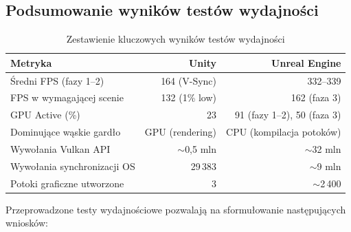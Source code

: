 \subsection{Podsumowanie wyników testów wydajności}
\label{subsec:podsumowanie-testow}

\begin{table}[H]
\centering
\caption{Zestawienie kluczowych wyników testów wydajności}
\label{tab:wyniki-wydajnosci}
\begin{tabular}{|l|r|r|}
\hline
\textbf{Metryka} & \textbf{Unity} & \textbf{Unreal Engine} \\
\hline
Średni FPS (fazy 1--2) & 164 (V-Sync) & 332--339 \\
FPS w wymagającej scenie & 132 (1\% low) & 162 (faza 3) \\
GPU Active (\%) & 23 & 91 (fazy 1--2), 50 (faza 3) \\
Dominujące wąskie gardło & GPU (rendering) & CPU (kompilacja potoków) \\
Wywołania Vulkan API & $\sim$0,5 mln & $\sim$32 mln \\
Wywołania synchronizacji OS & 29\,383 & $\sim$9 mln \\
Potoki graficzne utworzone & 3 & $\sim$2\,400 \\
\hline
\end{tabular}
\end{table}

Przeprowadzone testy wydajnościowe pozwalają na sformułowanie następujących wniosków:

